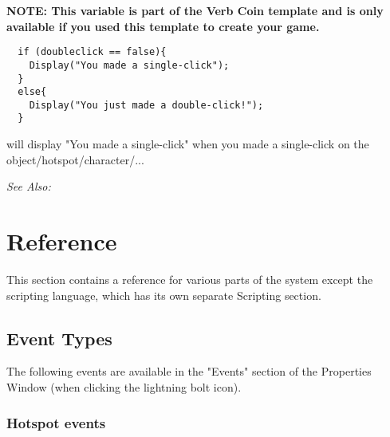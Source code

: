 \bf{NOTE:} This variable is part of the Verb Coin template and is only available if
you used this template to create your game.

\begin{verbatim}
  if (doubleclick == false){
    Display("You made a single-click");
  }
  else{
    Display("You just made a double-click!");
  }
\end{verbatim}

will display "You made a single-click" when you made a single-click on the object/hotspot/character/...

\it{See Also:} 




\chapter{Reference}%

This section contains a reference for various parts of the system except the scripting
language, which has its own separate Scripting section.

\section{Event Types}%

The following events are available in the "Events" section of the Properties Window
(when clicking the lightning bolt icon).

\subsection{Hotspot events}%

